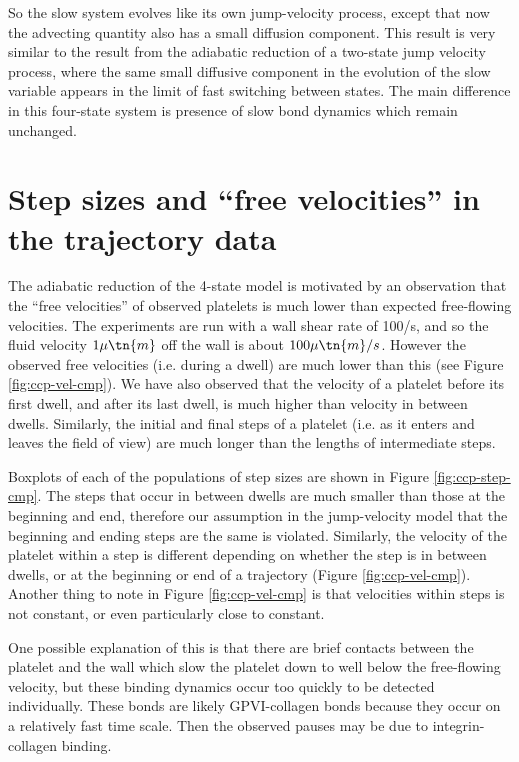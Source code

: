 So the slow system evolves like its own jump-velocity process, except
that now the advecting quantity also has a small diffusion
component. This result is very similar to the result from the adiabatic
reduction of a two-state jump velocity process, where the same small
diffusive component in the evolution of the slow variable appears in the
limit of fast switching between states. The main difference in this
four-state system is presence of slow bond dynamics which remain
unchanged.


\section{Step sizes and ``free velocities'' in the trajectory data}
\label{sec:step-sizes-free}


The adiabatic reduction of the 4-state model is motivated by an
observation that the ``free velocities'' of observed platelets is much
lower than expected free-flowing velocities. The experiments are run
with a wall shear rate of 100/s, and so the fluid velocity $1 \mu\tn{m}$
off the wall is about $100 \mu\tn{m}/s$. However the observed free
velocities (i.e. during a dwell) are much lower than this (see Figure
\ref{fig:ccp-vel-cmp}). We have also observed that the velocity of a
platelet before its first dwell, and after its last dwell, is much
higher than velocity in between dwells. Similarly, the initial and final
steps of a platelet (i.e. as it enters and leaves the field of view) are
much longer than the lengths of intermediate steps.

Boxplots of each of the populations of step sizes are shown in Figure
\ref{fig:ccp-step-cmp}. The steps that occur in between dwells are much
smaller than those at the beginning and end, therefore our assumption in
the jump-velocity model that the beginning and ending steps are the same
is violated. Similarly, the velocity of the platelet within a step is
different depending on whether the step is in between dwells, or at the
beginning or end of a trajectory (Figure \ref{fig:ccp-vel-cmp}). Another
thing to note in Figure \ref{fig:ccp-vel-cmp} is that velocities within
steps is not constant, or even particularly close to constant.

One possible explanation of this is that there are brief contacts
between the platelet and the wall which slow the platelet down to well
below the free-flowing velocity, but these binding dynamics occur too
quickly to be detected individually. These bonds are likely
GPVI-collagen bonds because they occur on a relatively fast time
scale. Then the observed pauses may be due to integrin-collagen binding.

